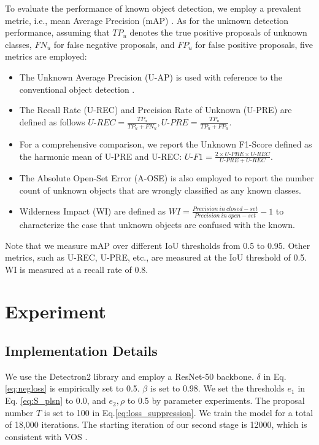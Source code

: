 \documentclass[10pt,twocolumn,letterpaper]{article}
\newcommand{\xf}[1]{{\color{black} #1}}
\begin{document}
To evaluate the performance of known object detection,
we employ a prevalent metric,
i.e., mean Average Precision (mAP) \cite{vos}.
As for the unknown detection performance,
assuming that $TP_u$ denotes the true positive proposals of unknown classes,
$FN_u$ for false negative proposals,
and $FP_u$ for false positive proposals,
five metrics are employed:
\begin{itemize}
    \item The Unknown Average Precision (U-AP) is used with reference to the conventional object detection \cite{voc}.
    \item The Recall Rate (U-REC) and Precision Rate of Unknown (U-PRE) are defined \xf{as follows} $U\mbox{-}REC = \frac{TP_u}{TP_u+FN_u}, U\mbox{-}PRE = \frac{TP_u}{TP_u+FP_u}$.
    \item For a comprehensive comparison,
    we report the Unknown F1-Score defined as the harmonic mean of U-PRE and U-REC: $U\mbox{-}F1 = \frac{2 \times U\mbox{-}PRE \times U\mbox{-}REC}{U\mbox{-}PRE + U\mbox{-}REC}$.
    \item The Absolute Open-Set Error (A-OSE) \cite{miller2018dropout} is also employed to report the number count of unknown objects that are wrongly classiﬁed as any known classes.
    \item Wilderness Impact (WI) \cite{dhamija2020overlooked} are defined as $WI = \frac{Precision\ in\ closed{-}set}{Precision\ in\ open{-}set} - 1$ to characterize the case that unknown objects are confused with the known.
\end{itemize}

\xf{Note} that we measure mAP over different IoU thresholds from 0.5 to 0.95.
Other metrics, such as U-REC, U-PRE, etc., are measured at the IoU threshold of 0.5. WI is measured at a recall rate of 0.8.


\section{Experiment}
\subsection{Implementation Details}
\label{sec:imp}
We use the Detectron2 \cite{wu2019detectron2} library and employ a ResNet-50 \cite{he2016deep} backbone.
$\delta$ in Eq. \ref{eq:negloss} is empirically set to 0.5.
$\beta$ is set to 0.98.
We set the thresholds $e_1$ in Eq. \ref{eq:S_plsn} to 0.0,
and $e_2, \rho$ to 0.5 by parameter experiments.
The proposal number $T$ is set to 100 in Eq.\ref{eq:loss_suppression}.
We train the model for a total of 18,000 iterations.
The starting iteration of our second stage is 12000,
which is consistent with VOS \cite{vos}.
\end{document}
